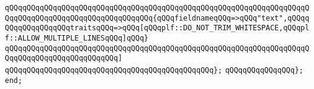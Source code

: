 \verb|qQQqqQQqqQQqqQQqqQQqqQQqqQQqqQQqqQQqqQQqqQQqqQQqqQQqqQQqqQQqqQQqqQQqqQQqqQQqqQQqqQQqqQQqqQQqqQQqqQQqqQQq{qQQqfieldnameqQQq=>qQQq"text",qQQqqQQqqQQqqQQqqQQqtraitsqQQq=>qQQq[qQQqplf::DO_NOT_TRIM_WHITESPACE,qQQqplf::ALLOW_MULTIPLE_LINESqQQq]qQQq}|\newline
\verb|qQQqqQQqqQQqqQQqqQQqqQQqqQQqqQQqqQQqqQQqqQQqqQQqqQQqqQQqqQQqqQQqqQQqqQQqqQQqqQQqqQQqqQQqqQQqqQQq]|\newline
\verb|qQQqqQQqqQQqqQQqqQQqqQQqqQQqqQQqqQQqqQQqqQQqqQQq};|\newline
\newline
\newline
\newline
\verb|qQQqqQQqqQQqqQQq};|\newline
\verb|end;|\newline

